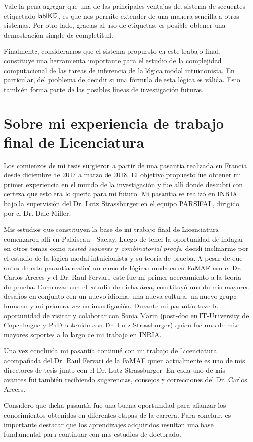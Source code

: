 Vale la pena agregar que una de las principales ventajas del sistema de secuentes etiquetado $\mathsf{labIK\heartsuit}$, es que nos permite extender de una manera sencilla a otros sistemas. Por otro lado, gracias al uso de etiquetas, es posible obtener una demostración simple de completitud.

Finalmente, consideramos que el sistema propuesto en este trabajo final, constituye una herramienta importante para el estudio de la complejidad computacional de las tareas de inferencia de la lógica modal intuicionista. En particular, del problema de decidir si una fórmula de esta lógica es válida. Esto también forma parte de las posibles líneas de investigación futuras.

 
 \section{Sobre mi experiencia de trabajo final de Licenciatura}
 
 Los comienzos de mi tesis surgieron a partir de una pasantía realizada en Francia desde diciembre de 2017 a marzo de 2018. El objetivo propuesto fue obtener mi primer experiencia en el mundo de la investigación y fue allí donde descubrí con certeza que esto era lo quería para mi futuro. Mi pasantía se realizó en INRIA bajo la supervisión del Dr. Lutz Strassburger en el equipo PARSIFAL, dirigido por el Dr. Dale Miller. 
 
 Mis estudios que constituyen la base de mi trabajo final de Licenciatura comenzaron allí en Palaiseau - Saclay. Luego de tener la oportunidad de indagar en otros temas como \emph{nested sequents} y \emph{combinatorial proofs}, decidí inclinarme por el estudio de la lógica modal intuicionista y su teoría de prueba. A pesar de que antes de esta pasantía realicé un curso de lógicas modales en FaMAF con el Dr. Carlos Areces y el Dr. Raul Fervari, este fue mi primer acercamiento a la teoría de prueba. Comenzar con el estudio de dicha área, constituyó uno de mis mayores desafíos en conjunto con un nuevo idioma, una nueva cultura, un nuevo grupo humano y mi primera vez en investigación. Durante mi pasantía tuve la oportunidad de visitar y colaborar con Sonia Marin (post-doc en IT-University de Copenhague y PhD obtenido con Dr. Lutz Strassburger) quien fue uno de mis mayores soportes a lo largo de mi trabajo en INRIA. 
 
Una vez concluida mi pasantía continué con mi trabajo de Licenciatura acompañada del Dr. Raul Fervari de la FaMAF quien actualmente es uno de mis directores de tesis junto con el Dr. Lutz Strassburger. En cada uno de mis avances fui también recibiendo sugerencias, consejos y correcciones del Dr. Carlos Areces.

Considero que dicha pasantía fue una buena oportunidad para afianzar los conocimientos obtenidos en diferentes etapas de la carrera. Para concluir, es importante destacar que los aprendizajes adquiridos resultan una base fundamental para continuar con mis estudios de doctorado.
 